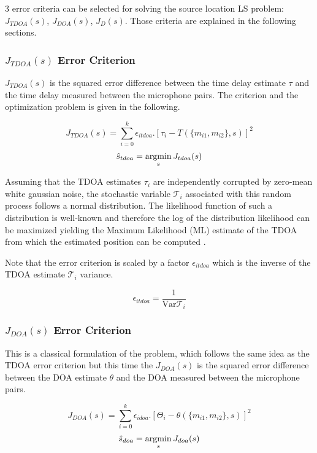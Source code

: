 3 error criteria can be selected for solving the source location LS problem:  $J_{TDOA}(s)$, $J_{DOA}(s)$, $J_{D}(s)$. Those criteria are explained in the following sections.

\subsubsection{$J_{TDOA}(s)$ Error Criterion}

$J_{TDOA}(s)$ is the squared error difference between the time delay estimate $\tau$ and the time delay measured between the microphone pairs. The criterion and the optimization problem is given in the following.

\begin{equation}
J_{TDOA}(s) = {\sum}_{i=0}^k \epsilon_{itdoa}.[\tau_{i}-T(\{m_{i1},m_{i2}\},s)]^2
\label{eq:jtdoa}
\end{equation}
\begin{equation}
\hat{s}_{tdoa}= \argmin_{s} J_{tdoa}(s) 
\end{equation}

Assuming that the TDOA estimates $\tau_{i}$ are independently corrupted by zero-mean white gaussian noise, the stochastic variable $\mathcal{T}_{i}$ associated with this random process follows a normal distribution. The likelihood function of such a distribution is well-known and therefore the log of the distribution likelihood can be maximized yielding the Maximum Likelihood (ML) estimate of the TDOA from which the estimated position can be computed . 

Note that the error criterion is scaled by a factor $\epsilon_{itdoa}$ which is the inverse of the TDOA estimate $\mathcal{T}_{i}$ variance. 

\begin{equation}
\epsilon_{itdoa}=\frac{1}{\mathrm{Var}{\mathcal{T}_{i}}}
\label{eq:epsilonjtdoa}
\end{equation}

\subsubsection{$J_{DOA}(s)$ Error Criterion}

This is a classical formulation of the problem, which follows the same idea as the TDOA error criterion but this time the $J_{DOA}(s)$ is the squared error difference between the DOA estimate $\theta$ and the DOA measured between the microphone pairs. 

\begin{equation}
J_{DOA}(s) = {\sum}_{i=0}^k \epsilon_{idoa}.[\Theta_{i}-\theta(\{m_{i1},m_{i2}\},s)]^2
\label{eq:jdoa}
\end{equation}
\begin{equation}
\hat{s}_{doa}= \argmin_{s} J_{doa}(s) 
\end{equation}


